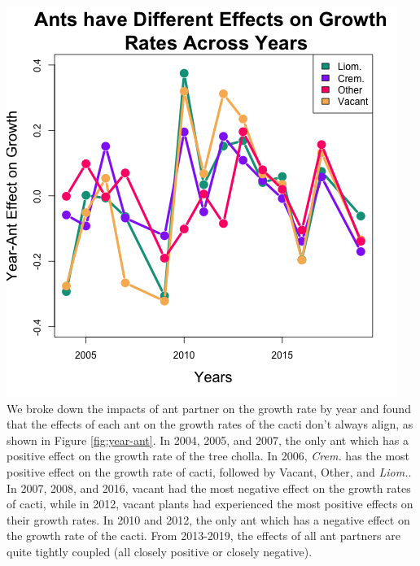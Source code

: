 \documentclass[12pt,a4paper]{article}
\begin{document}
{{\includegraphics{"Figures/grow_year_ant_timeseries.png"}
We broke down the impacts of ant partner on the growth rate by year and found that the effects of each ant on the growth rates of the cacti don’t always align, as shown in Figure \ref{fig:year-ant}. 
In 2004, 2005, and 2007, the only ant which has a positive effect on the growth rate of the tree cholla. 
In 2006, \textit{Crem.} has the most positive effect on the growth rate of cacti, followed by Vacant, Other, and \textit{Liom.}. 
In 2007, 2008, and 2016, vacant had the most negative effect on the growth rates of cacti, while in 2012, vacant plants had experienced the most positive effects on their growth rates. 
In 2010 and 2012, the only ant which has a negative effect on the growth rate of the cacti. 
From 2013-2019, the effects of all ant partners are quite tightly coupled (all closely positive or closely negative). 

}}
\end{document}
